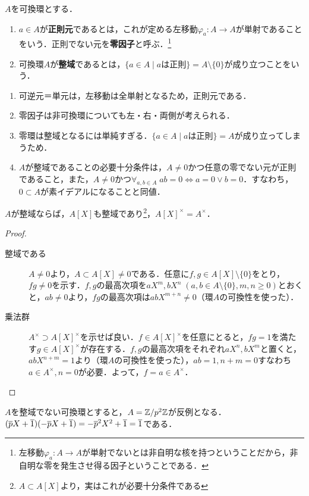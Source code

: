 \documentclass[uplatex,dvipdfmx]{jsreport}
\begin{document}
\begin{definition}
    $A$を可換環とする．
    \begin{enumerate}
        \item $a\in A$が\textbf{正則元}であるとは，これが定める左移動$\varphi_a:A\to A$が単射であることをいう．正則でない元を\textbf{零因子}と呼ぶ．\footnote{左移動$\varphi_a:A\to A$が単射でないとは非自明な核を持つということだから，非自明な零を発生させ得る因子ということである．}
        \item 可換環$A$が\textbf{整域}であるとは，$\{a\in A\mid aは正則\}=A\setminus\{0\}$が成り立つことをいう．
    \end{enumerate}
\end{definition}
\begin{remark}\mbox{}\label{remark-integral-domain}
    \begin{enumerate}
        \item 可逆元＝単元は，左移動は全単射となるため，正則元である．
        \item 零因子は非可換環についても左・右・両側が考えられる．
        \item 零環は整域となるには単純すぎる．$\{a\in A\mid aは正則\}=A$が成り立ってしまうため．
        \item $A$が整域であることの必要十分条件は，$A\ne 0$かつ任意の零でない元が正則であること，また，$A\ne 0$かつ$\forall_{a,b\in A}\;ab=0\Leftrightarrow a=0\lor b=0$．すなわち，$0\subset A$が素イデアルになることと同値．
    \end{enumerate}
\end{remark}

\begin{proposition}\label{prop-if-A-polynomials-is-integral-domain}
    $A$が整域ならば，$A[X]$も整域であり\footnote{$A\subset A[X]$より，実はこれが必要十分条件である}，$A[X]^\times=A^\times$．
\end{proposition}
\begin{proof}\mbox{}
    \begin{description}
        \item[整域である] $A\ne 0$より，$A\subset A[X]\ne 0$である．任意に$f,g\in A[X]\setminus\{0\}$をとり，$fg\ne 0$を示す．$f,g$の最高次項を$aX^m,bX^n\;(a,b\in A\setminus\{0\},m,n\ge 0)$とおくと，$ab\ne 0$より，$fg$の最高次項は$abX^{m+n}\ne 0$（環$A$の可換性を使った）．
        \item[乗法群] $A^\times\supset A[X]^\times$を示せば良い．$f\in A[X]^\times$を任意にとると，$fg=1$を満たす$g\in A[X]^\times$が存在する．$f,g$の最高次項をそれぞれ$aX^n,bX^m$と置くと，$abX^{n+m}=1$より（環$A$の可換性を使った），$ab=1,n+m=0$すなわち$a\in A^\times,n=0$が必要．よって，$f=a\in A^\times$．
    \end{description}
\end{proof}
\begin{remark}
    $A$を整域でない可換環とすると，$A=\mathbb{Z}/p^2\mathbb{Z}$が反例となる．
    $(\overline{p}X+\overline{1})(-\overline{p}X+\overline{1})=-\overline{p}^2X^2+\overline{1}=\overline{1}$である．
\end{remark}
\end{document}
